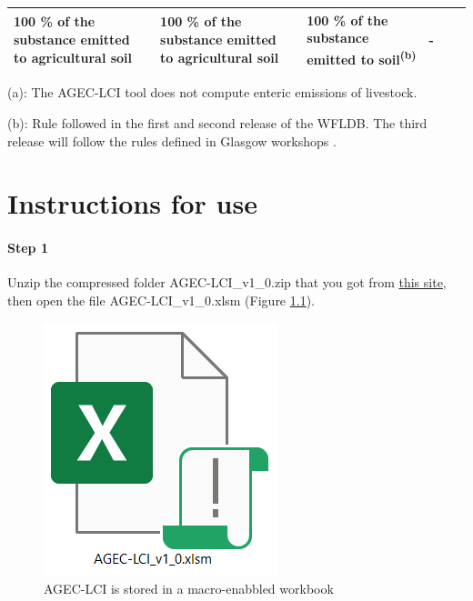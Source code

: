\documentclass[openany]{book}
\begin{document}
\begin{longtable}[]{@{}llllll@{}}
\begin{minipage}[t]{0.12\columnwidth}
100 \% of the substance emitted to agricultural soil\strut
\end{minipage} & \begin{minipage}[t]{0.13\columnwidth}\raggedright
100 \% of the substance emitted to agricultural soil\strut
\end{minipage} & \begin{minipage}[t]{0.12\columnwidth}\raggedright
100 \% of the substance emitted to soil\textsuperscript{(b)}\strut
\end{minipage} & \begin{minipage}[t]{0.17\columnwidth}\raggedright
-\strut
\end{minipage}\tabularnewline
\bottomrule
\end{longtable}

(a): The AGEC-LCI tool does not compute enteric emissions of livestock.

(b): Rule followed in the first and second release of the WFLDB. The third release will follow the rules defined in Glasgow workshops \citep{nemecek2014}.

\hypertarget{instructions}{%
\chapter{Instructions for use}\label{instructions}}

\hypertarget{step-1}{%
\subsubsection*{Step 1}\label{step-1}}

Unzip the compressed folder AGEC-LCI\_v1\_0.zip that you got from \href{}{this site}, then open the file AGEC-LCI\_v1\_0.xlsm (Figure \ref{fig:agec-icon}).

\begin{figure}[ht]

{\centering \includegraphics[width=0.15\linewidth]{Figures/agec_lci_icon} 

}

\caption{AGEC-LCI is stored in a macro-enabbled workbook}\label{fig:agec-icon}
\end{figure}
\end{document}

